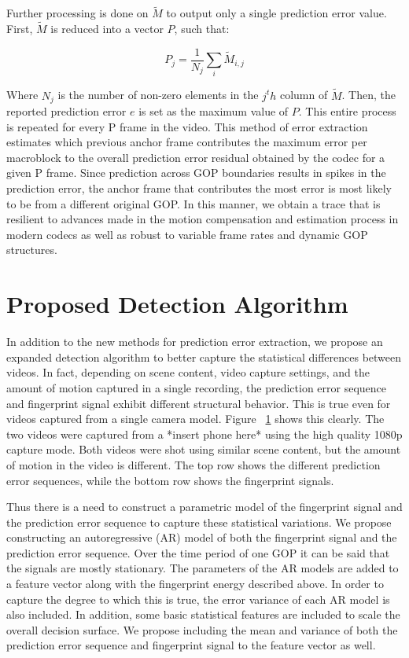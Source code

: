 Further processing is done on $\tilde{M}$ to output only a single prediction error value. First, $\tilde{M}$ is reduced into a vector $P$, such that:

\begin{equation}
  P_{j} = \frac{1}{N_{j}} \sum_{i}{\tilde{M}_{i,j}}
\end{equation}

Where $N_{j}$ is the number of non-zero elements in the $j^th$ column of $\tilde{M}$. Then, the reported prediction error $e$ is set as the maximum value of $P$. This entire process is repeated for every P frame in the video. This method of error extraction estimates which previous anchor frame contributes the maximum error per macroblock to the overall prediction error residual obtained by the codec for a given P frame. Since prediction across GOP boundaries results in spikes in the prediction error, the anchor frame that contributes the most error is most likely to be from a different original GOP. In this manner, we obtain a trace that is resilient to advances made in the motion compensation and estimation process in modern codecs as well as robust to variable frame rates and dynamic GOP structures.

\section{Proposed Detection Algorithm}

In addition to the new methods for prediction error extraction, we propose an expanded detection algorithm to better capture the statistical differences between videos. In fact, depending on scene content, video capture settings, and the amount of motion captured in a single recording, the prediction error sequence and fingerprint signal exhibit different structural behavior. This is true even for videos captured from a single camera model. Figure ~\ref{} shows this clearly. The two videos were captured from a *insert phone here* using the high quality 1080p capture mode. Both videos were shot using similar scene content, but the amount of motion in the video is different. The top row shows the different prediction error sequences, while the bottom row shows the fingerprint signals.


Thus there is a need to construct a parametric model of the fingerprint signal and the prediction error sequence to capture these statistical variations. We propose constructing an autoregressive (AR) model of both the fingerprint signal and the prediction error sequence. Over the time period of one GOP it can be said that the signals are mostly stationary. The parameters of the AR models are added to a feature vector along with the fingerprint energy described above. In order to capture the degree to which this is true, the error variance of each AR model is also included. In addition, some basic statistical features are included to scale the overall decision surface. We propose including the mean and variance of both the prediction error sequence and fingerprint signal to the feature vector as well.

